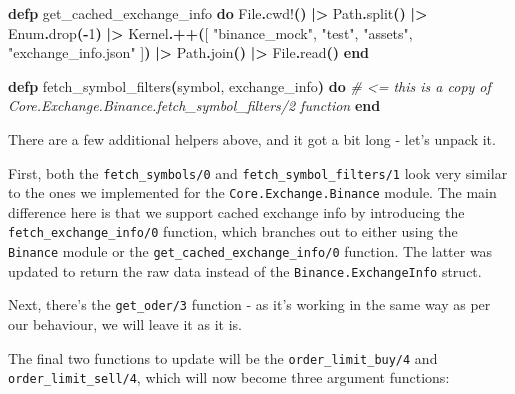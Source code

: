 \documentclass[
  oneside]{book}
\newenvironment{Shaded}{\begin{snugshade}}{\end{snugshade}}
\newcommand{\CommentTok}[1]{\textcolor[rgb]{0.56,0.35,0.01}{\textit{#1}}}
\newcommand{\ConstantTok}[1]{\textcolor[rgb]{0.56,0.35,0.01}{#1}}
\newcommand{\DecValTok}[1]{\textcolor[rgb]{0.00,0.00,0.81}{#1}}
\newcommand{\FunctionTok}[1]{\textcolor[rgb]{0.13,0.29,0.53}{\textbf{#1}}}
\newcommand{\KeywordTok}[1]{\textcolor[rgb]{0.13,0.29,0.53}{\textbf{#1}}}
\newcommand{\NormalTok}[1]{#1}
\newcommand{\OperatorTok}[1]{\textcolor[rgb]{0.81,0.36,0.00}{\textbf{#1}}}
\newcommand{\OtherTok}[1]{\textcolor[rgb]{0.56,0.35,0.01}{#1}}
\newcommand{\StringTok}[1]{\textcolor[rgb]{0.31,0.60,0.02}{#1}}
\begin{document}
\begin{Shaded}
\begin{Highlighting}[]
  \KeywordTok{defp}\NormalTok{ get\_cached\_exchange\_info }\KeywordTok{do}
    \ConstantTok{File}\OperatorTok{.}\NormalTok{cwd!}\FunctionTok{()}
    \OperatorTok{|\textgreater{}} \ConstantTok{Path}\OperatorTok{.}\NormalTok{split}\FunctionTok{()}
    \OperatorTok{|\textgreater{}} \ConstantTok{Enum}\OperatorTok{.}\NormalTok{drop}\FunctionTok{(}\OperatorTok{{-}}\DecValTok{1}\FunctionTok{)}
    \OperatorTok{|\textgreater{}} \ConstantTok{Kernel}\OperatorTok{.++}\FunctionTok{(}\OtherTok{[}
      \StringTok{"binance\_mock"}\NormalTok{,}
      \StringTok{"test"}\NormalTok{,}
      \StringTok{"assets"}\NormalTok{,}
      \StringTok{"exchange\_info.json"}
    \OtherTok{]}\FunctionTok{)}
    \OperatorTok{|\textgreater{}} \ConstantTok{Path}\OperatorTok{.}\NormalTok{join}\FunctionTok{()}
    \OperatorTok{|\textgreater{}} \ConstantTok{File}\OperatorTok{.}\NormalTok{read}\FunctionTok{()}
  \KeywordTok{end}

  \KeywordTok{defp}\NormalTok{ fetch\_symbol\_filters}\FunctionTok{(}\NormalTok{symbol, exchange\_info}\FunctionTok{)} \KeywordTok{do}
    \CommentTok{\# \textless{}= this is a copy of \textasciigrave{}Core.Exchange.Binance.fetch\_symbol\_filters/2\textasciigrave{} function}
  \KeywordTok{end}
\end{Highlighting}
\end{Shaded}

There are a few additional helpers above, and it got a bit long - let's unpack it.

First, both the \texttt{fetch\_symbols/0} and \texttt{fetch\_symbol\_filters/1} look very similar to the ones we implemented for the \texttt{Core.Exchange.Binance} module. The main difference here is that we support cached exchange info by introducing the \texttt{fetch\_exchange\_info/0} function, which branches out to either using the \texttt{Binance} module or the \texttt{get\_cached\_exchange\_info/0} function. The latter was updated to return the raw data instead of the \texttt{Binance.ExchangeInfo} struct.

Next, there's the \texttt{get\_oder/3} function - as it's working in the same way as per our behaviour, we will leave it as it is.

\newpage

The final two functions to update will be the \texttt{order\_limit\_buy/4} and \texttt{order\_limit\_sell/4}, which will now become three argument functions:
\end{document}

